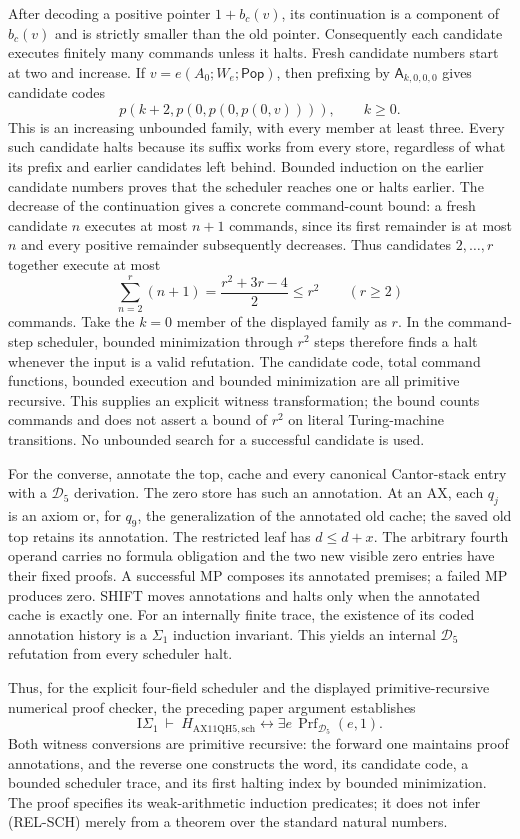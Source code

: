 After decoding a positive pointer $1+b_c(v)$, its continuation is a
component of $b_c(v)$ and is strictly smaller than the old pointer.
Consequently each candidate executes finitely many commands unless it
halts.  Fresh candidate numbers start at two and increase.  If
$v=e(A_0;W_e;\mathsf{Pop})$, then prefixing by
$\mathsf A_{k,0,0,0}$ gives candidate codes
\[
       p(k+2,p(0,p(0,p(0,v)))),\qquad k\geq0.
\]
This is an increasing unbounded family, with every member at least
three.  Every such candidate halts because its suffix works from
every store, regardless of what its prefix and earlier candidates
left behind.  Bounded induction on the earlier candidate numbers
proves that the scheduler reaches one or halts earlier.  The decrease
of the continuation gives a concrete command-count bound: a fresh
candidate $n$ executes at most $n+1$ commands, since its first remainder
is at most $n$ and every positive remainder subsequently decreases.
Thus candidates $2,\ldots,r$ together execute at most
\[
 \sum_{n=2}^{r}(n+1)=\frac{r^2+3r-4}{2}\leq r^2
 \qquad(r\geq2)
\]
commands.  Take the $k=0$ member of the displayed family as $r$.
In the command-step scheduler, bounded minimization through $r^2$
steps therefore finds a halt whenever the input is a valid refutation.
The candidate code, total command functions, bounded execution and
bounded minimization are all primitive recursive.  This supplies an
explicit witness transformation; the bound counts commands and does
not assert a bound of $r^2$ on literal Turing-machine transitions.
No unbounded search for a successful candidate is used.

For the converse, annotate the top, cache and every canonical
Cantor-stack entry with a $\mathcal D_5$ derivation.  The zero store
has such an annotation.  At an AX, each $q_j$ is an axiom or, for
$q_9$, the generalization of the annotated old cache; the saved old
top retains its annotation.  The restricted leaf has
$d\leq d+x$.  The arbitrary fourth operand carries no formula
obligation and the two new visible zero entries have their fixed
proofs.  A successful MP composes its annotated premises; a failed
MP produces zero.  SHIFT moves annotations and halts only when
the annotated cache is exactly one.  For an internally finite
trace, the existence of its coded annotation history is a
$\Sigma_1$ induction invariant.  This yields an internal
$\mathcal D_5$ refutation from every scheduler halt.

Thus, for the explicit four-field scheduler and the displayed
primitive-recursive numerical proof checker, the preceding paper
argument establishes
\[
 \mathrm I\Sigma_1\ \vdash\
  H_{\mathrm{AX11QH5,sch}}
    \longleftrightarrow
  \exists e\,\operatorname{Prf}_{\mathcal D_5}(e,1).
 \tag{REL-SCH}
\]
Both witness conversions are primitive recursive: the forward one
maintains proof annotations, and the reverse one constructs the word,
its candidate code, a bounded scheduler trace, and its first halting
index by bounded minimization.  The proof specifies its weak-arithmetic
induction predicates; it does not infer (REL-SCH) merely from a theorem
over the standard natural numbers.

